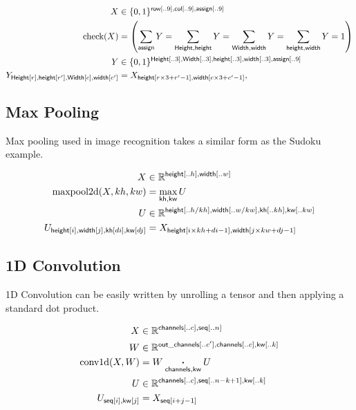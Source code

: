 \documentclass{article}
\newcommand{\reals}{\mathbb{R}}
\begin{document}
\begin{align*} 
X &\in \{0, 1\}^{\mathsf{row}[..9], \mathsf{col}[..9], \mathsf{assign}[..9]}  \\
\text{check}(X) &=
\left(\sum\limits_{\mathsf{assign}} Y = 
\sum\limits_{\mathsf{Height, height}} Y = 
\sum\limits_{\mathsf{Width, width}} Y =  
\sum\limits_{\mathsf{height, width}} Y = 1 \right) \\
Y &\in \{0, 1\}^{\mathsf{Height}[..3], \mathsf{Width}[..3], \mathsf{height}[..3], \mathsf{width}[..3], \mathsf{assign}[..9]}  \\
Y_{\mathsf{Height}[r], \mathsf{height}[r'], \mathsf{Width}[c], \mathsf{width}[c']} &= X_{\mathsf{height}[r\times 3 + r'-1], \mathsf{width}[c\times3 + c'-1]}, 
\end{align*} 


\subsection{Max Pooling}

Max pooling used in image recognition takes a similar form as the Sudoku example.

\begin{align*} 
X &\in \reals^{\nset{height}{..h}, \nset{width}{..w}} \\
\text{maxpool2d}(X, kh, kw) &=  \nfun{kh, kw}{max} U \\
U &\in \reals^{{\nset{height}{..h / kh}, \nset{width}{..w / kw}, \nset{kh}{..kh}, \nset{kw}{..kw}}} \\
U_{\nidx{height}{i}, \nidx{width}{j}, \nidx{kh}{di}, \nidx{kw}{dj}} & = X_{\nidx{height}{i \times kh + di -1}, \nidx{width}{j \times kw + dj -1}}  
\end{align*}



\subsection{1D Convolution}

1D Convolution can be easily written by unrolling a tensor and then
applying a standard dot product.

\begin{align*} 
X &\in \reals^{{\nset{channels}{..c}, \nset{seq}{..n}}}  \\
W &\in \reals^{{\nset{out\_channels}{..c'}, \nset{channels}{..c}, \nset{kw}{..k}}}  \\
\text{conv1d}(X, W) &= W \ndot{channels, kw} U \\
U &\in \reals^{{\nset{channels}{..c}, \nset{seq}{..n-k +1}, \nset{kw}{..k}}}  \\
U_{\nidx{seq}{i}, \nidx{kw}{j}} & = X_{\nidx{seq}{i+j - 1}}  
\end{align*} 
\end{document}
